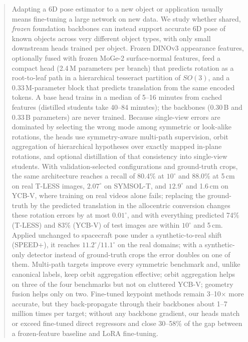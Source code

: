 \begin{abstract}
Adapting a 6D pose estimator to a new object or application usually means fine-tuning a large network on new data. We study whether shared, \emph{frozen} foundation backbones can instead support accurate 6D pose of known objects across very different object types, with only small downstream heads trained per object. Frozen DINOv3 appearance features, optionally fused with frozen MoGe-2 surface-normal features, feed a compact head (2.4\,M parameters per branch) that predicts rotation as a root-to-leaf path in a hierarchical tesseract partition of $SO(3)$, and a 0.33\,M-parameter block that predicts translation from the same encoded tokens. A base head trains in a median of 5--16 minutes from cached features (distilled students take 40--84 minutes); the backbones (0.30\,B and 0.33\,B parameters) are never trained.
Because single-view errors are dominated by selecting the wrong mode among symmetric or look-alike rotations, the heads use symmetry-aware multi-path supervision, orbit aggregation of hierarchical hypotheses over exactly mapped in-plane rotations, and optional distillation of that consistency into single-view students.
With validation-selected configurations and ground-truth crops, the same architecture reaches a recall of 80.4\% at $10^\circ$ and 88.0\% at 5\,cm on real T-LESS images, $2.07^\circ$ on SYMSOL-T, and $12.9^\circ$ and 1.6\,cm on YCB-V, where training on real videos alone fails; replacing the ground-truth by the predicted translation in the allocentric conversion changes these rotation errors by at most $0.01^\circ$, and with everything predicted 74\% (T-LESS) and 83\% (YCB-V) of test images are within $10^\circ$ and 5\,cm. Applied unchanged to spacecraft pose under a synthetic-to-real shift (SPEED+), it reaches $11.2^\circ/11.1^\circ$ on the real domains; with a synthetic-only detector instead of ground-truth crops the error doubles on one of them. Multi-path targets improve every symmetric benchmark and, unlike canonical labels, keep orbit aggregation effective; orbit aggregation helps on three of the four benchmarks but not on cluttered YCB-V; geometry fusion helps only on two. Fine-tuned keypoint methods remain 3--10$\times$ more accurate, but they back-propagate through their backbones about 1--7 million times per target; without any backbone gradient, our heads match or exceed fine-tuned direct regressors and close 30--58\% of the gap between a frozen-feature baseline and LoRA fine-tuning.
\end{abstract}
